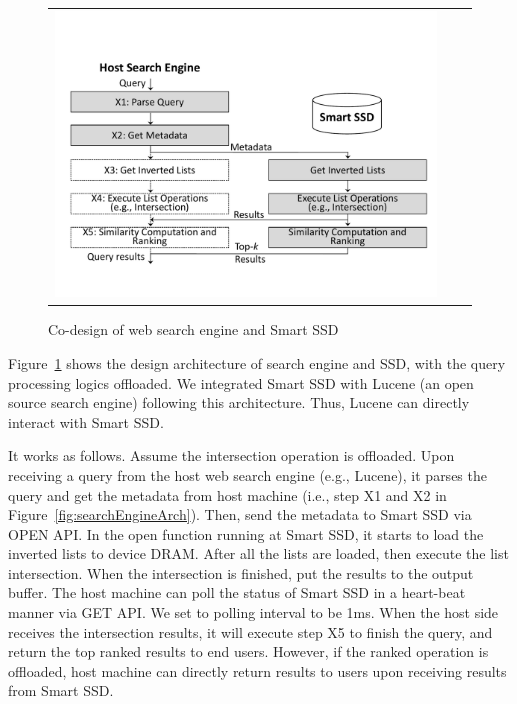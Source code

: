 \begin{figure}[htbp]
  \centering
  \begin{tabular}{ccc}
 \includegraphics[width=1.0\columnwidth]{figures/SmartSSDLucene.pdf}
\end{tabular}
  \caption{Co-design of web search engine and Smart SSD}
  \label{fig:SmartSSDLucene}
 \end{figure}

Figure~\ref{fig:SmartSSDLucene} shows the design architecture of search engine and SSD, with the query processing logics offloaded.
We integrated Smart SSD with Lucene (an open source search engine) following this architecture. Thus, Lucene can directly interact with Smart SSD.

It works as follows. Assume the intersection operation is offloaded. Upon receiving a query from the host web search engine (e.g., Lucene), it parses the query and get the metadata from host machine (i.e., step X1 and X2 in Figure~\ref{fig:searchEngineArch}). Then, send the metadata to Smart SSD via OPEN API.
In the open function running at Smart SSD, it starts to load the inverted lists to device DRAM. After all the lists are loaded, then execute the list intersection. When the intersection is finished, put the results to the output buffer. The host machine can poll the status of Smart SSD in a heart-beat manner via GET API. We set to  polling interval to be 1ms. When the host side receives the intersection results, it will execute step X5 to finish the query, and return the top ranked results to end users. However, if the ranked operation is offloaded, host machine can directly return results to users upon receiving results from Smart SSD.
